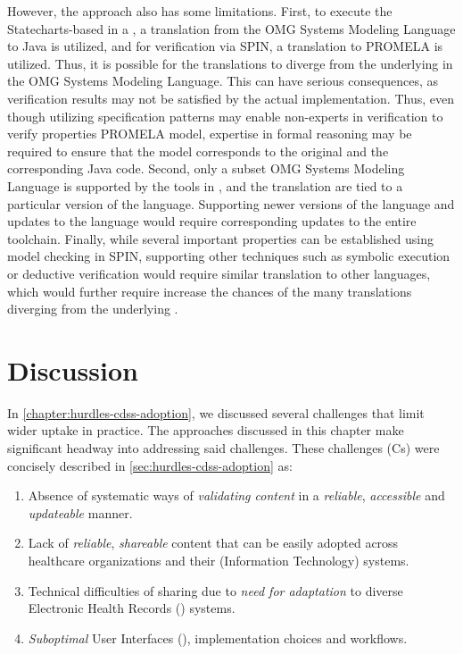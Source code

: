 However, the approach also has some limitations. First, to execute the
Statecharts-based \BPG{} in a \CDSS{}, a translation from the OMG Systems
Modeling Language \cite{OMGSpecUrl} to Java is utilized, and for
verification via SPIN, a translation to PROMELA is utilized. Thus, it
is possible for the translations to diverge from the underlying \BPG{}
in the OMG Systems Modeling Language. This can have serious
consequences, as verification results may not be satisfied by the actual
implementation. Thus, even though utilizing specification patterns
may enable non-experts in verification to verify properties PROMELA model,
expertise in formal reasoning may be required to ensure that the model
corresponds to the original \BPG{} and the corresponding Java code.
Second, only a subset OMG Systems Modeling Language is supported
by the tools in \cite{PerezJBI10,PorresECBS08}, and the translation
are tied to a particular version of the language. Supporting newer
versions of the language and updates to the language would require
corresponding updates to the entire toolchain. Finally, while several
important properties can be established using model checking in SPIN,
supporting other techniques such as symbolic execution or deductive
verification would require similar translation to other languages, which
would further require increase the chances of the many translations
diverging from the underlying \BPG{}.

\section{Discussion}\label{sec:related-work-discussion}

In \autoref{chapter:hurdles-cdss-adoption}, we discussed several
challenges that limit wider \CDSSs{} uptake in practice. The
approaches discussed in this chapter make significant headway into
addressing said challenges. These challenges (Cs) were concisely
described in \autoref{sec:hurdles-cdss-adoption} as:
\begin{enumerate}[label=C\arabic*.]
\itemsep0.0em
\item Absence of systematic ways of \emph{validating content}
in a \emph{reliable}, \emph{accessible} and \emph{updateable} manner.
\item Lack of \emph{reliable}, \emph{shareable} \CDSS{} content
that can be easily adopted across healthcare organizations and their (Information
Technology) \IT{} systems.
\item Technical difficulties of sharing due to \emph{need for
  adaptation} to diverse Electronic Health Records (\EHR) systems.
\item \emph{Suboptimal} User Interfaces (\UIs), implementation choices and
workflows.
\end{enumerate}

